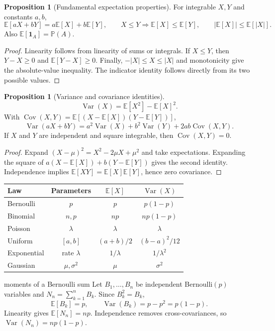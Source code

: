 \documentclass[10pt]{article}
\newcommand{\E}{\mathbb E}
\newcommand{\Pbb}{\mathbb P}
\newcommand{\Var}{\operatorname{Var}}
\newcommand{\Cov}{\operatorname{Cov}}
\newcommand{\1}{\mathbf 1}
\theoremstyle{definition}
\newtheorem{proposition}[definition]{Proposition}
\begin{document}
\begin{proposition}[Fundamental expectation properties]
For integrable $X,Y$ and constants $a,b$,
\[
\E[aX+bY]=a\E[X]+b\E[Y],
\qquad
X\le Y\Longrightarrow \E[X]\le\E[Y],
\qquad
|\E[X]|\le\E[|X|].
\]
Also $\E[\1_A]=\Pbb(A)$.
\end{proposition}

\begin{proof}
Linearity follows from linearity of sums or integrals. If $X\le Y$, then
$Y-X\ge0$ and $\E[Y-X]\ge0$. Finally,
$-|X|\le X\le|X|$ and monotonicity give the absolute-value inequality.
The indicator identity follows directly from its two possible values.
\end{proof}

\begin{proposition}[Variance and covariance identities]
\[
\Var(X)=\E[X^2]-\E[X]^2.
\]
With
$\Cov(X,Y)=\E[(X-\E[X])(Y-\E[Y])]$,
\[
\Var(aX+bY)=a^2\Var(X)+b^2\Var(Y)+2ab\Cov(X,Y).
\]
If $X$ and $Y$ are independent and square integrable, then $\Cov(X,Y)=0$.
\end{proposition}

\begin{proof}
Expand $(X-\mu)^2=X^2-2\mu X+\mu^2$ and take expectations. Expanding the
square of $a(X-\E[X])+b(Y-\E[Y])$ gives the second identity. Independence
implies $\E[XY]=\E[X]\E[Y]$, hence zero covariance.
\end{proof}

\begin{center}
\renewcommand{\arraystretch}{1.15}
\begin{tabular}{@{}lccc@{}}
\toprule
Law & Parameters & $\E[X]$ & $\Var(X)$\\
\midrule
Bernoulli & $p$ & $p$ & $p(1-p)$\\
Binomial & $n,p$ & $np$ & $np(1-p)$\\
Poisson & $\lambda$ & $\lambda$ & $\lambda$\\
Uniform & $[a,b]$ & $(a+b)/2$ & $(b-a)^2/12$\\
Exponential & rate $\lambda$ & $1/\lambda$ & $1/\lambda^2$\\
Gaussian & $\mu,\sigma^2$ & $\mu$ & $\sigma^2$\\
\bottomrule
\end{tabular}
\end{center}

\begin{boardexample}{moments of a Bernoulli sum}
Let $B_1,\ldots,B_n$ be independent Bernoulli$(p)$ variables and
$N_n=\sum_{k=1}^nB_k$. Since $B_k^2=B_k$,
\[
\E[B_k]=p,
\qquad \Var(B_k)=p-p^2=p(1-p).
\]
Linearity gives $\E[N_n]=np$. Independence removes cross-covariances, so
$\Var(N_n)=np(1-p)$.
\end{boardexample}
\end{document}
